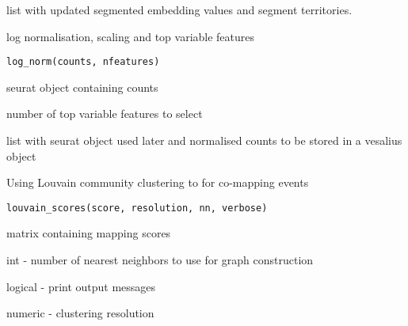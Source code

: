 \documentclass[a4paper]{book}
\begin{document}
%
\begin{Value}
list with updated segmented embedding values 
and segment territories.
\end{Value}
%
\begin{Description}
log normalisation, scaling and top variable features
\end{Description}
%
\begin{Usage}
\begin{verbatim}
log_norm(counts, nfeatures)
\end{verbatim}
\end{Usage}
%
\begin{Arguments}
\begin{ldescription}
\item[\code{counts}] seurat object containing counts

\item[\code{nfeatures}] number of top variable features to select
\end{ldescription}
\end{Arguments}
%
\begin{Value}
list with seurat object used later and normalised counts to be stored
in a vesalius object
\end{Value}
%
\begin{Description}
Using Louvain community clustering to for co-mapping events
\end{Description}
%
\begin{Usage}
\begin{verbatim}
louvain_scores(score, resolution, nn, verbose)
\end{verbatim}
\end{Usage}
%
\begin{Arguments}
\begin{ldescription}
\item[\code{score}] matrix containing mapping scores

\item[\code{nn}] int - number of nearest neighbors to use for graph construction

\item[\code{verbose}] logical - print output messages

\item[\code{resoltuion}] numeric - clustering resolution
\end{ldescription}
\end{Arguments}
\end{document}
